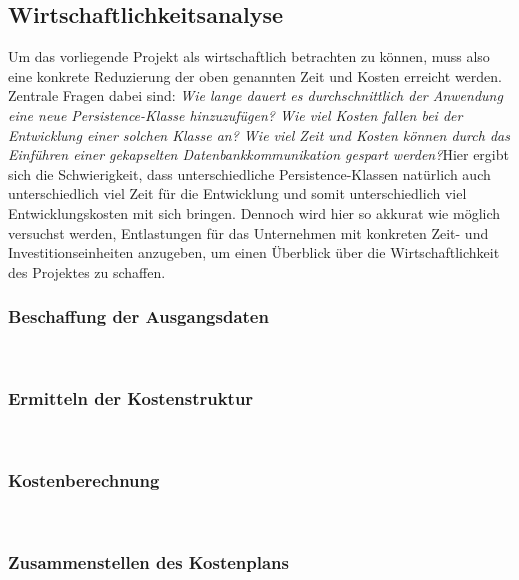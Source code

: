 \documentclass[11pt,toc=sectionentrywithoutdots, 
headheight=44pt, headings=optiontoheadandtoc, hyperfootnotes=false, hypertexnames=false]{scrartcl}
\begin{document}
\subsection{Wirtschaftlichkeitsanalyse}
Um das vorliegende Projekt als wirtschaftlich betrachten zu können, muss also eine konkrete Reduzierung der oben genannten Zeit und Kosten erreicht werden. Zentrale Fragen dabei sind: \textit{Wie lange dauert es durchschnittlich der Anwendung eine neue Persistence-Klasse hinzuzufügen? Wie viel Kosten fallen bei der Entwicklung einer solchen Klasse an? Wie viel Zeit und Kosten können durch das Einführen einer gekapselten Datenbankkommunikation gespart werden?}\newline Hier ergibt sich die Schwierigkeit, dass unterschiedliche Persistence-Klassen natürlich auch unterschiedlich viel Zeit für die Entwicklung und somit unterschiedlich viel Entwicklungskosten mit sich bringen. Dennoch wird hier so akkurat wie möglich versuchst werden, Entlastungen für das Unternehmen mit konkreten Zeit- und Investitionseinheiten anzugeben, um einen Überblick über die Wirtschaftlichkeit des Projektes zu schaffen.


\subsubsection{Beschaffung der Ausgangsdaten}
\blindtext\

\subsubsection{Ermitteln der Kostenstruktur}
\blindtext\

\subsubsection{Kostenberechnung}
\blindtext\

\subsubsection{Zusammenstellen des Kostenplans}
\blindtext\
\end{document}
